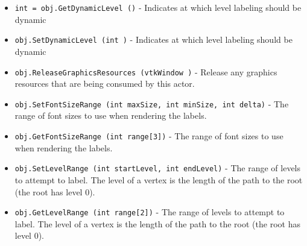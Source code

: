 \begin{itemize}
\item  \verb|int = obj.GetDynamicLevel ()| -  Indicates at which level labeling should be dynamic 

\item  \verb|obj.SetDynamicLevel (int )| -  Indicates at which level labeling should be dynamic 

\item  \verb|obj.ReleaseGraphicsResources (vtkWindow )| -  Release any graphics resources that are being consumed by this actor.

\item  \verb|obj.SetFontSizeRange (int maxSize, int minSize, int delta)| -  The range of font sizes to use when rendering the labels.

\item  \verb|obj.GetFontSizeRange (int range[3])| -  The range of font sizes to use when rendering the labels.

\item  \verb|obj.SetLevelRange (int startLevel, int endLevel)| -  The range of levels to attempt to label.
 The level of a vertex is the length of the path to the root
 (the root has level 0).

\item  \verb|obj.GetLevelRange (int range[2])| -  The range of levels to attempt to label.
 The level of a vertex is the length of the path to the root
 (the root has level 0).

\end{itemize}
